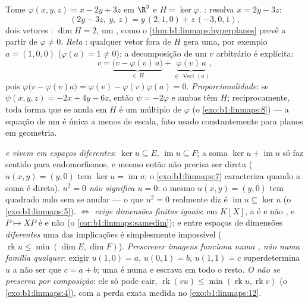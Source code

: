 \begin{example}
\label{ex:b1:linmaps:hyperplanerun}
Tome $\varphi(x, y, z) = x - 2y + 3z$ em $\R^3$ e $H =
\ker\varphi$. \emph{}: resolva $x = 2y - 3z$:
\[
(2y - 3z,\ y,\ z) = y\,(2, 1, 0) + z\,(-3, 0, 1),
\]
dois vetores : $\dim H = 2$, um , como o \cref{thm:b1:linmaps:hyperplanes} prevê a
partir de $\varphi \neq
0$. \emph{Reta }: qualquer vetor fora de
$H$ gera uma, por exemplo $a = (1, 0, 0)$ ($\varphi(a) = 1 \neq 0$); a decomposição de um $v$
arbitrário é explícita:
\[
v = \underbrace{\bigl(v - \varphi(v)\,a\bigr)}_{\in\,H}
+ \underbrace{\varphi(v)\,a}_{\in\,\operatorname{Vect}(a)},
\]
pois $\varphi\bigl(v - \varphi(v)a\bigr) = \varphi(v) -
\varphi(v)\varphi(a) = 0$. \emph{Proporcionalidade}: se $\psi(x,y,z)
= -2x + 4y - 6z$, então $\psi = -2\varphi$ e ambas
têm  $H$; reciprocamente, toda forma que se anula em $H$ é um
múltiplo de $\varphi$ (o \cref{exo:b1:linmaps:8}) --- a equação de um  é
única a menos de escala, fato usado constantemente para planos em
geometria.
\end{example}

\begin{remark}
\label{rem:b1:linmaps:pitfalls}
\emph{ e  vivem em espaços diferentes}: $\ker u
\subseteq E$, $\operatorname{im} u \subseteq F$;
a soma $\ker u
+ \operatorname{im} u$ só faz sentido para endomorfismos, e mesmo então não
precisa ser direta ($u(x, y) = (y, 0)$ tem $\ker u
= \operatorname{im} u$; o \cref{exo:b1:linmaps:7} caracteriza quando a
soma é direta).
\emph{$u^2 = 0$ não significa $u = 0$}: o mesmo $u(x,y) =
(y, 0)$ tem quadrado
nulo sem se anular --- o que $u^2 = 0$ realmente diz é $\operatorname{im} u \subseteq \ker u$
(o \cref{exo:b1:linmaps:5}).
\emph{ $\iff$  exige dimensões finitas iguais}:
em $K[X]$, a  é  e não , e $P \mapsto XP$ é
 e não  (o \cref{cor:b1:linmaps:samedim}); e entre espaços de dimensões
\emph{diferentes} uma das implicações é simplesmente impossível
($\operatorname{rk} u \leq \min(\dim E, \dim F)$).
\emph{Prescrever imagens funciona numa , não numa família
qualquer}: exigir $u(1, 0) = a$, $u(0, 1) = b$, $u(1, 1) = c$ superdetermina $u$ a não
ser que $c = a + b$; uma  é  numa  e escrava em
todo o resto.
\emph{O  não se preserva por composição}: ele só pode cair,
$\operatorname{rk}(vu) \leq \min(\operatorname{rk} u,
\operatorname{rk} v)$ (o \cref{exo:b1:linmaps:4}), com a perda exata medida no \cref{exo:b1:linmaps:12}.
\end{remark}

